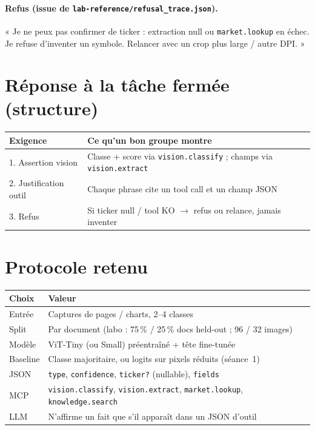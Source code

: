\documentclass[11pt,a4paper]{article}
\begin{document}
\paragraph{Refus (issue de \texttt{lab-reference/refusal\_trace.json}).}
« Je ne peux pas confirmer de ticker : extraction null ou \texttt{market.lookup}
en échec. Je refuse d'inventer un symbole. Relancer avec un crop plus large / autre DPI. »

\section{Réponse à la tâche fermée (structure)}

\begin{center}
\renewcommand{\arraystretch}{1.2}
\begin{tabular}{@{}p{4.0cm}p{10.6cm}@{}}
\toprule
\textbf{Exigence} & \textbf{Ce qu'un bon groupe montre} \\
\midrule
1. Assertion vision & Classe + score via \texttt{vision.classify} ; champs via \texttt{vision.extract} \\
2. Justification outil & Chaque phrase cite un tool call et un champ JSON \\
3. Refus & Si ticker null / tool KO $\rightarrow$ refus ou relance, jamais inventer \\
\bottomrule
\end{tabular}
\end{center}

\section{Protocole retenu}

\begin{center}
\renewcommand{\arraystretch}{1.15}
\begin{tabular}{@{}p{3.8cm}p{10.8cm}@{}}
\toprule
\textbf{Choix} & \textbf{Valeur} \\
\midrule
Entrée & Captures de pages / charts, 2--4 classes \\
Split & Par document (labo : 75\,\% / 25\,\% docs held-out ; 96 / 32 images) \\
Modèle & ViT-Tiny (ou Small) préentraîné + tête fine-tunée \\
Baseline & Classe majoritaire, ou logits sur pixels réduits (séance~1) \\
JSON & \texttt{type}, \texttt{confidence}, \texttt{ticker?} (nullable), \texttt{fields} \\
MCP & \texttt{vision.classify}, \texttt{vision.extract}, \texttt{market.lookup}, \texttt{knowledge.search} \\
LLM & N'affirme un fait que s'il apparaît dans un JSON d'outil \\
\bottomrule
\end{tabular}
\end{center}
\end{document}
